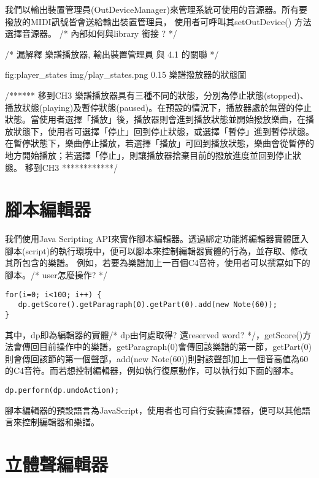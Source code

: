 \documentclass[12pt,a4paper,oneside]{report}
\begin{document}
我們以輸出裝置管理員(OutDeviceManager)來管理系統可使用的音源器。所有要撥放的MIDI訊號皆會送給輸出裝置管理員， 使用者可呼叫其setOutDevice() 方法選擇音源器。 /* 內部如何與library 銜接 ?  */

/*  漏解釋 樂譜播放器, 輸出裝置管理員 與 4.1 的關聯  */


\figurewithcaption
{fig:player_states}
{img/play_states.png}
{0.15}
{樂譜撥放器的狀態圖}

/****** 移到CH3  
樂譜播放器具有三種不同的狀態，分別為停止狀態(stopped)、播放狀態(playing)及暫停狀態(paused)。在預設的情況下，播放器處於無聲的停止狀態。當使用者選擇「播放」後，播放器則會進到播放狀態並開始撥放樂曲，在播放狀態下，使用者可選擇「停止」回到停止狀態，或選擇「暫停」進到暫停狀態。在暫停狀態下，樂曲停止播放，若選擇「播放」可回到播放狀態，樂曲會從暫停的地方開始播放；若選擇「停止」，則讓播放器捨棄目前的撥放進度並回到停止狀態。
 移到CH3  ************/  


\section{腳本編輯器}

我們使用Java Scripting API來實作腳本編輯器。透過綁定功能將編輯器實體匯入腳本(script)的執行環境中，便可以腳本來控制編輯器實體的行為，並存取、修改其所包含的樂譜。
例如，若要為樂譜加上一百個C4音符，使用者可以撰寫如下的腳本。/* user怎麼操作? */

\begin{verbatim}
for(i=0; i<100; i++) { 
   dp.getScore().getParagraph(0).getPart(0).add(new Note(60));
}
\end{verbatim}

其中，dp即為編輯器的實體/* dp由何處取得? 還reserved word?  */，getScore()方法會傳回目前操作中的樂譜，getParagraph(0)會傳回該樂譜的第一節，getPart(0)則會傳回該節的第一個聲部，add(new Note(60))則對該聲部加上一個音高值為60的C4音符。而若想控制編輯器，例如執行復原動作，可以執行如下面的腳本。

\begin{verbatim}
dp.perform(dp.undoAction);
\end{verbatim}

腳本編輯器的預設語言為JavaScript，使用者也可自行安裝直譯器，便可以其他語言來控制編輯器和樂譜。

\section{立體聲編輯器}
\end{document}
